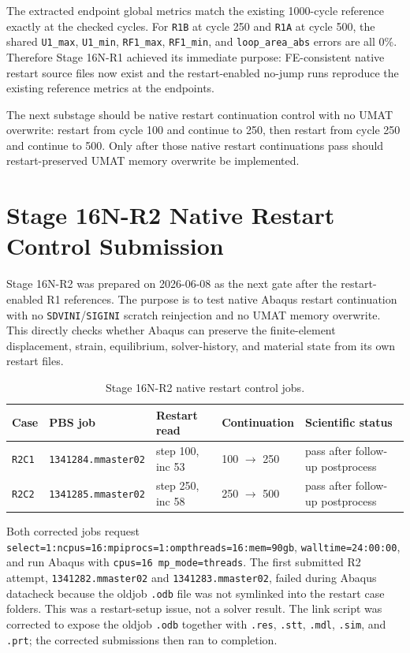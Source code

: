 \documentclass[11pt,a4paper]{article}
\newcommand{\code}[1]{\texttt{#1}}
\begin{document}
The extracted endpoint global metrics match the existing 1000-cycle reference exactly at the checked cycles. For \code{R1B} at cycle 250 and \code{R1A} at cycle 500, the shared \code{U1\_max}, \code{U1\_min}, \code{RF1\_max}, \code{RF1\_min}, and \code{loop\_area\_abs} errors are all 0\%. Therefore Stage 16N-R1 achieved its immediate purpose: FE-consistent native restart source files now exist and the restart-enabled no-jump runs reproduce the existing reference metrics at the endpoints.

The next substage should be native restart continuation control with no UMAT overwrite: restart from cycle 100 and continue to 250, then restart from cycle 250 and continue to 500. Only after those native restart continuations pass should restart-preserved UMAT memory overwrite be implemented.

\section{Stage 16N-R2 Native Restart Control Submission}

Stage 16N-R2 was prepared on 2026-06-08 as the next gate after the restart-enabled R1 references. The purpose is to test native Abaqus restart continuation with no \code{SDVINI}/\code{SIGINI} scratch reinjection and no UMAT memory overwrite. This directly checks whether Abaqus can preserve the finite-element displacement, strain, equilibrium, solver-history, and material state from its own restart files.

\begin{table}[H]
\centering
\caption{Stage 16N-R2 native restart control jobs.}
\begin{tabular}{lllll}
\toprule
Case & PBS job & Restart read & Continuation & Scientific status \\
\midrule
\code{R2C1} & \code{1341284.mmaster02} & step 100, inc 53 & 100 $\rightarrow$ 250 & pass after follow-up postprocess \\
\code{R2C2} & \code{1341285.mmaster02} & step 250, inc 58 & 250 $\rightarrow$ 500 & pass after follow-up postprocess \\
\bottomrule
\end{tabular}
\end{table}

Both corrected jobs request \code{select=1:ncpus=16:mpiprocs=1:ompthreads=16:mem=90gb}, \code{walltime=24:00:00}, and run Abaqus with \code{cpus=16 mp\_mode=threads}. The first submitted R2 attempt, \code{1341282.mmaster02} and \code{1341283.mmaster02}, failed during Abaqus datacheck because the oldjob \code{.odb} file was not symlinked into the restart case folders. This was a restart-setup issue, not a solver result. The link script was corrected to expose the oldjob \code{.odb} together with \code{.res}, \code{.stt}, \code{.mdl}, \code{.sim}, and \code{.prt}; the corrected submissions then ran to completion.
\end{document}
